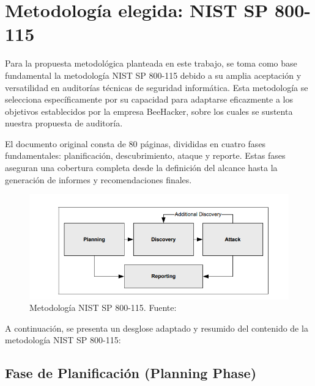 \documentclass[a4paper, 11pt]{article}
\begin{document}
\clearpage

\thispagestyle{nohead}





\section{Metodología elegida: NIST SP 800-115}

Para la propuesta metodológica planteada en este trabajo, se toma como base fundamental la metodología NIST SP 800-115 debido a su amplia aceptación y versatilidad en auditorías técnicas de seguridad informática. Esta metodología se selecciona específicamente por su capacidad para adaptarse eficazmente a los objetivos establecidos por la empresa BeeHacker, sobre los cuales se sustenta nuestra propuesta de auditoría. 

El documento original consta de 80 páginas, divididas en cuatro fases fundamentales: planificación, descubrimiento, ataque y reporte. Estas fases aseguran una cobertura completa desde la definición del alcance hasta la generación de informes y recomendaciones finales. \cite{nist800115} 

\begin{figure}[H]
    \centering
    \includegraphics[width=13cm]{images/nist_800115.png}
    \caption{Metodología NIST SP 800-115. Fuente: \cite{nist800115}}
    \label{fig:nist_800115}
\end{figure}

A continuación, se presenta un desglose adaptado y resumido del contenido de la metodología NIST SP 800-115:

\subsection{Fase de Planificación (Planning Phase)}
\end{document}
